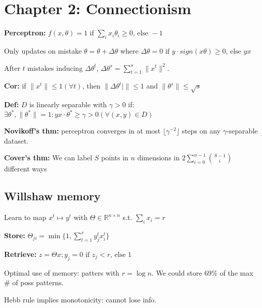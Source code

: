 \section*{Chapter 2: Connectionism}

\textbf{Perceptron: } $f(x, \theta) = 1 \text{ if } \sum_i x_i\theta_i \geq 0 \text{, else } -1$

Only updates on mistake $\theta = \theta + \Delta\theta$ where $\Delta\theta = 0 \text{ if } y\cdot sign(x\theta) \geq 0 \text{, else } yx$

After $t$ mistakes inducing $\Delta\theta^t$, $\Delta\theta^s = \sum_{t=1}^s\|x^t\|^2$.

\textbf{Cor:} if $\|x^t\|\leq 1 (\forall t)$, then $\|\Delta\theta^t|\| \leq 1$ and $\|\theta^s\| \leq \sqrt{s}$

\textbf{Def:} $D$ is linearly separable with $\gamma > 0$ if: $\exists\theta^*, \|\theta^*\| = 1 : yx\cdot\theta^* \geq \gamma > 0 (\forall(x,y) \in D)$

\textbf{Novikoff's thm:} perceptron converges in at most $\lfloor\gamma^{-2}\rfloor$ steps on any $\gamma$-separable dataset. 

\textbf{Cover's thm:} We can label $S$ points in $n$ dimensions in $2\sum_{i=0}^{n-1}\binom{S-1}{i}$ different ways

\subsection*{Willshaw memory}
Learn to map $x^t \mapsto y^t$ with $\Theta \in \mathbb{R}^{n\times n}$ s.t. $\sum_i x_i = r$

\textbf{Store: } $\Theta_{ji} = \min\{1, \sum_{t=1}^sy_j^tx_i^t\}$

\textbf{Retrieve: } $z = \Theta x; y_j = 0 \text{ if } z_j < r \text{, else } 1$

Optimal use of memory: patters with $r=\log n$. We could store 69\% of the max \# of poss patterns.

Hebb rule implies monotonicity: cannot lose info.

